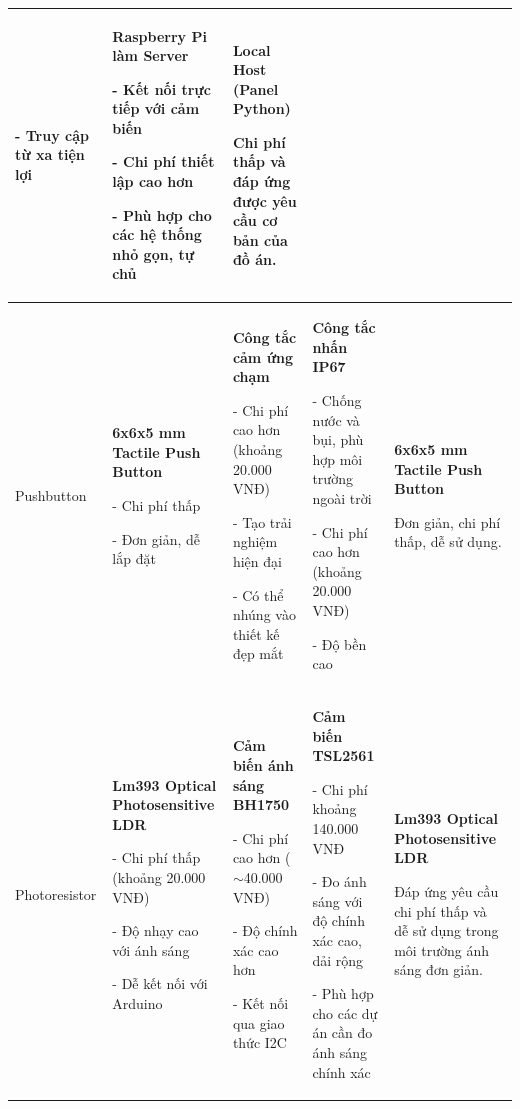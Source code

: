 {{\begin{longtable}{|p{2.3cm}|p{3.2cm}|p{3.2cm}|p{3.2cm}|p{3.5cm}|}
- Truy cập từ xa tiện lợi & \textbf{Raspberry Pi làm Server}


- Kết nối trực tiếp với cảm biến


- Chi phí thiết lập cao hơn


- Phù hợp cho các hệ thống nhỏ gọn, tự chủ & \textbf{Local Host (Panel Python)}


Chi phí thấp và đáp ứng được yêu cầu cơ bản của đồ án. \\ \hline

Pushbutton 

& \textbf{6x6x5 mm Tactile Push Button}


- Chi phí thấp


- Đơn giản, dễ lắp đặt & \textbf{Công tắc cảm ứng chạm}


- Chi phí cao hơn (khoảng 20.000 VNĐ)


- Tạo trải nghiệm hiện đại


- Có thể nhúng vào thiết kế đẹp mắt & \textbf{Công tắc nhấn IP67}


- Chống nước và bụi, phù hợp môi trường ngoài trời


- Chi phí cao hơn (khoảng 20.000 VNĐ)


- Độ bền cao 

& \textbf{6x6x5 mm Tactile Push Button}


Đơn giản, chi phí thấp, dễ sử dụng. \\ \hline

Photoresistor 

& \textbf{Lm393 Optical Photosensitive LDR}


- Chi phí thấp (khoảng 20.000 VNĐ)


- Độ nhạy cao với ánh sáng


- Dễ kết nối với Arduino & \textbf{Cảm biến ánh sáng BH1750}


- Chi phí cao hơn ($\sim$40.000 VNĐ)


- Độ chính xác cao hơn


- Kết nối qua giao thức I2C 

& \textbf{Cảm biến TSL2561}


- Chi phí khoảng  140.000 VNĐ


- Đo ánh sáng với độ chính xác cao, dải rộng


- Phù hợp cho các dự án cần đo ánh sáng chính xác 

& \textbf{Lm393 Optical Photosensitive LDR}


Đáp ứng yêu cầu chi phí thấp và dễ sử dụng trong môi trường ánh sáng đơn giản. \\ \hline


\end{longtable}}}
